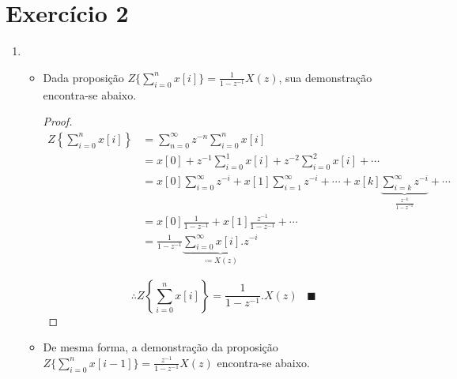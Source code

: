 \section*{Exercício 2}
\label{ex:2}

    \begin{enumerate}
        \item %
            \begin{itemize}
            	\item Dada proposição $Z\{\sum_{i=0}^{n}x[i] \} = \frac{1}{1-z^{-1}}X(z)$, sua demonstração encontra-se abaixo.
            	
            	\begin{proof}
            	\begin{equation}
            	\begin{split}
            	Z\left\{\sum_{i=0}^{n}x[i] \right\} & = \sum_{n=0}^{\infty} z^{-n} \sum_{i=0}^{n} x[i] \\
            	& = x[0] + z^{-1} \sum_{i=0}^{1} x[i] + z^{-2} \sum_{i=0}^{2} x[i] + \cdots \\
            	& = x[0] \sum_{i=0}^{\infty} z^{-i} + x[1] \sum_{i=1}^{\infty} z^{-i} + \cdots + x[k] 
            	\underbrace{\sum_{i=k}^{\infty} z^{-i}}_{\frac{z^{-k}}{1 - z^{-1}}} + \cdots\\
            	& = x[0] \frac{1}{1 - z^{-1}} + x[1] \frac{z^{-1}}{1 - z^{-1}} + \cdots \\
            	& = \frac{1}{1 - z^{-1}} \underbrace{\sum_{i=0}^{\infty} x[i].z^{-i}}_{\coloneqq X(z)}
            	\end{split}
            	\end{equation}
            
            	\begin{equation}
            	\therefore Z\left\{\sum_{i=0}^{n}x[i] \right\} = \frac{1}{1-z^{-1}}.X(z) \hspace{10pt} \blacksquare
            	\end{equation}
            	\end{proof}
            	
            	\item De mesma forma, a demonstração da proposição $Z\{\sum_{i=0}^{n}x[i-1] \} = \frac{z^{-1}}{1-z^{-1}}X(z)$ encontra-se abaixo.
                

\end{itemize}
\end{enumerate}
